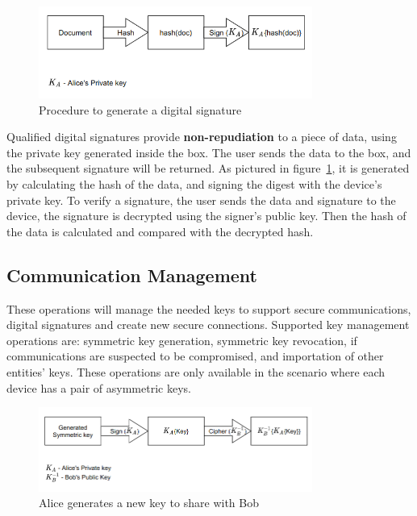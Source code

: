 \begin{figure}[h]
    \centering
    \includegraphics[width=0.8\textwidth]{./Images/arch-ds.png}
    \caption{Procedure to generate a digital signature}
    \label{fig:arch-ds}
\end{figure}

Qualified digital signatures provide \textbf{non-repudiation} to a piece of data, using the private key generated inside the box. The user sends the data to the box, and the subsequent signature will be returned. As pictured in figure~\ref{fig:arch-ds}, it is generated by calculating the hash of the data, and signing the digest with the device's private key. To verify a signature, the user sends the data and signature to the device, the signature is decrypted using the signer's public key. Then the hash of the data is calculated and compared with the decrypted hash.

\subsection{Communication Management}\label{chap:arch:ops:key}

These operations will manage the needed keys to support secure communications, digital signatures and create new secure connections.
Supported key management operations are: symmetric key generation, symmetric key revocation, if communications are suspected to be compromised, and importation of other entities' keys.
These operations are only available in the scenario where each device has a pair of asymmetric keys.

\begin{figure}[h]
    \centering
    \includegraphics[width=0.8\textwidth]{./Images/arch-share-key.png}
    \caption{Alice generates a new key to share with Bob}
    \label{fig:arch-share-key}
\end{figure}

